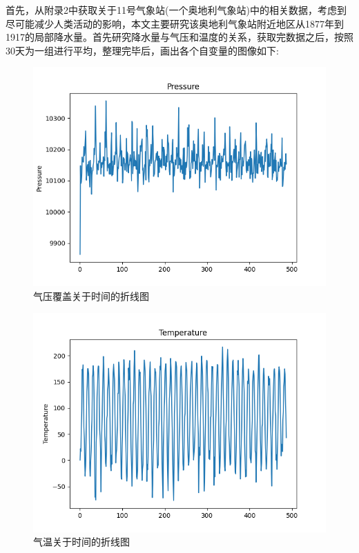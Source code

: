 \documentclass[UTF8, a4paper]{ctexart}
\begin{document}
首先，从附录2中获取关于11号气象站(一个奥地利气象站)中的相关数据，考虑到尽可能减少人类活动的影响，本文主要研究该奥地利气象站附近地区从1877年到1917的局部降水量。首先研究降水量与气压和温度的关系，获取完数据之后，按照$30$天为一组进行平均，整理完毕后，画出各个自变量的图像如下:
\begin{figure}[h!]
	\centering
	\includegraphics[scale=0.5]{pp.png}
	\caption{气压覆盖关于时间的折线图}
\end{figure}


\begin{figure}[h!]
	\centering
	\includegraphics[scale=0.5]{tg.png}
	\caption{气温关于时间的折线图}
\end{figure}
\end{document}
